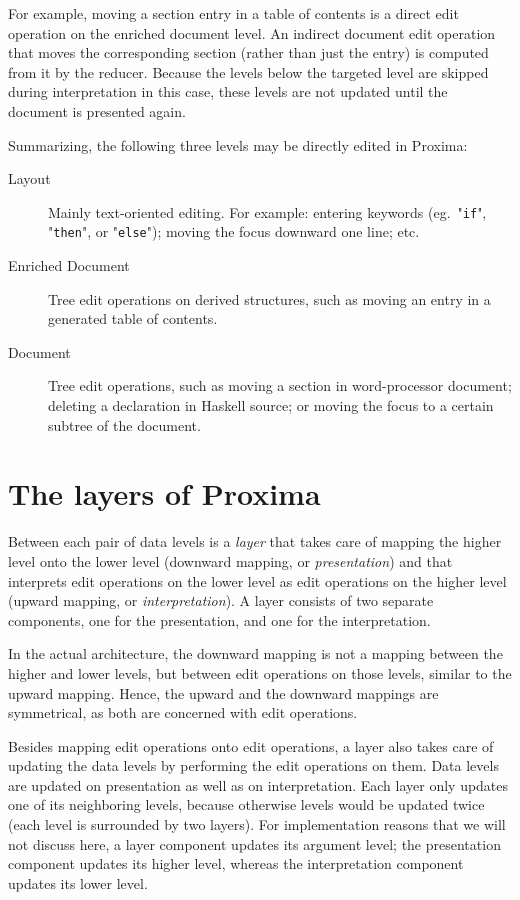 \bc %
For example, moving a section entry in a table of contents is a direct edit operation on the enriched document level. An indirect document edit operation that moves the corresponding section (rather than just the entry) is computed from it by the reducer. Because the levels below the targeted level are skipped during interpretation in this case, these levels are not updated until the document is presented again.  \ec

\bigskip

Summarizing, the following three levels may be directly edited in Proxima:

\begin{description}
\item[Layout] Mainly text-oriented editing. For example: entering keywords (eg.\ "\verb|if|", "\verb|then|", or "\verb|else|"); moving the focus downward one line; etc.
\item[Enriched Document] Tree edit operations on derived structures, such as moving an entry in a generated table of contents.
\item[Document] Tree edit operations, such as moving a section in word-processor document; deleting a declaration in Haskell source; or moving the focus to a certain subtree of the document.
\end{description}






%																
%																
%																
\section{The layers of Proxima} \label{sect:archProximaLayers}

Between each pair of data levels is a {\em layer} that takes care of mapping the higher level onto the lower level (downward mapping, or {\em presentation}) and that interprets edit operations on the lower level as edit operations on the higher level (upward mapping, or {\em interpretation}). A layer consists of two separate components, one for the presentation, and one for the interpretation. 

In the actual architecture, the downward mapping is not a mapping between the higher and lower levels, but between edit operations on those levels, similar to the upward mapping. Hence, the upward and the downward mappings are symmetrical, as both are concerned with edit operations. 

Besides mapping edit operations onto edit operations, a layer also takes care of updating the data levels by performing the edit operations on them. Data levels are updated on presentation as well as on interpretation. Each layer only updates one of its neighboring levels, because otherwise levels would be updated twice (each level is surrounded by two layers). For implementation reasons that we will not discuss here, a layer component updates its argument level; the presentation component updates its higher level, whereas the interpretation component updates its lower level. 


